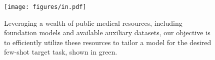 \begin{figure}
    \centering
\texttt{[image: figures/in.pdf]}
    \vspace{-0.2cm}
    \caption{Leveraging a wealth of public medical resources, including foundation models and available auxiliary datasets, our objective is to efficiently utilize these resources to tailor a model for the desired few-shot target task, shown in green.}
    \label{intro}
\vspace{-0.5cm}
\end{figure}